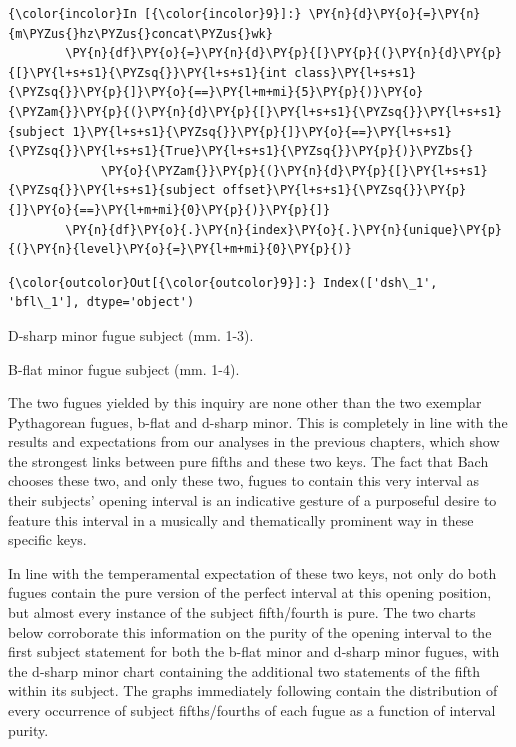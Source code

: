     \begin{Verbatim}[commandchars=\\\{\}]
{\color{incolor}In [{\color{incolor}9}]:} \PY{n}{d}\PY{o}{=}\PY{n}{m\PYZus{}hz\PYZus{}concat\PYZus{}wk}
        \PY{n}{df}\PY{o}{=}\PY{n}{d}\PY{p}{[}\PY{p}{(}\PY{n}{d}\PY{p}{[}\PY{l+s+s1}{\PYZsq{}}\PY{l+s+s1}{int class}\PY{l+s+s1}{\PYZsq{}}\PY{p}{]}\PY{o}{==}\PY{l+m+mi}{5}\PY{p}{)}\PY{o}{\PYZam{}}\PY{p}{(}\PY{n}{d}\PY{p}{[}\PY{l+s+s1}{\PYZsq{}}\PY{l+s+s1}{subject 1}\PY{l+s+s1}{\PYZsq{}}\PY{p}{]}\PY{o}{==}\PY{l+s+s1}{\PYZsq{}}\PY{l+s+s1}{True}\PY{l+s+s1}{\PYZsq{}}\PY{p}{)}\PYZbs{}
             \PY{o}{\PYZam{}}\PY{p}{(}\PY{n}{d}\PY{p}{[}\PY{l+s+s1}{\PYZsq{}}\PY{l+s+s1}{subject offset}\PY{l+s+s1}{\PYZsq{}}\PY{p}{]}\PY{o}{==}\PY{l+m+mi}{0}\PY{p}{)}\PY{p}{]}
        \PY{n}{df}\PY{o}{.}\PY{n}{index}\PY{o}{.}\PY{n}{unique}\PY{p}{(}\PY{n}{level}\PY{o}{=}\PY{l+m+mi}{0}\PY{p}{)}
\end{Verbatim}
\begin{Verbatim}[commandchars=\\\{\}]
{\color{outcolor}Out[{\color{outcolor}9}]:} Index(['dsh\_1', 'bfl\_1'], dtype='object')
\end{Verbatim}


\begin{Example}[H]
\vspace{1.5em}
    \centering
    \caption{ D-sharp minor fugue subject (mm. 1-3). }
\end{Example}    


\begin{Example}[H]
\vspace{1.5em}
    \centering
    \caption{ B-flat minor fugue subject (mm. 1-4). }
\end{Example}    
    The two fugues yielded by this inquiry are none other than the two
exemplar Pythagorean fugues, b-flat and d-sharp minor. This is
completely in line with the results and expectations from our analyses
in the previous chapters, which show the strongest links between pure
fifths and these two keys. The fact that Bach chooses these two, and
only these two, fugues to contain this very interval as their subjects'
opening interval is an indicative gesture of a purposeful desire to
feature this interval in a musically and thematically prominent way in
these specific keys.

In line with the temperamental expectation of these two keys, not only
do both fugues contain the pure version of the perfect interval at this
opening position, but almost every instance of the subject fifth/fourth
is pure. The two charts below corroborate this information on the purity
of the opening interval to the first subject statement for both the
b-flat minor and d-sharp minor fugues, with the d-sharp minor chart
containing the additional two statements of the fifth within its
subject. The graphs immediately following contain the distribution of
every occurrence of subject fifths/fourths of each fugue as a function
of interval purity.

